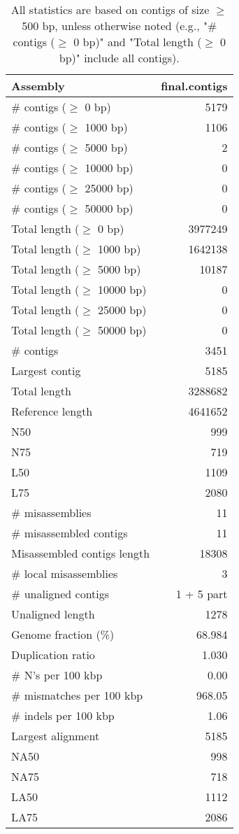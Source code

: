 \documentclass[12pt,a4paper]{article}
\begin{document}
\begin{table}[ht]
\begin{center}
\caption{All statistics are based on contigs of size $\geq$ 500 bp, unless otherwise noted (e.g., "\# contigs ($\geq$ 0 bp)" and "Total length ($\geq$ 0 bp)" include all contigs).}
\begin{tabular}{|l*{1}{|r}|}
\hline
Assembly & final.contigs \\ \hline
\# contigs ($\geq$ 0 bp) & 5179 \\ \hline
\# contigs ($\geq$ 1000 bp) & 1106 \\ \hline
\# contigs ($\geq$ 5000 bp) & 2 \\ \hline
\# contigs ($\geq$ 10000 bp) & 0 \\ \hline
\# contigs ($\geq$ 25000 bp) & 0 \\ \hline
\# contigs ($\geq$ 50000 bp) & 0 \\ \hline
Total length ($\geq$ 0 bp) & 3977249 \\ \hline
Total length ($\geq$ 1000 bp) & 1642138 \\ \hline
Total length ($\geq$ 5000 bp) & 10187 \\ \hline
Total length ($\geq$ 10000 bp) & 0 \\ \hline
Total length ($\geq$ 25000 bp) & 0 \\ \hline
Total length ($\geq$ 50000 bp) & 0 \\ \hline
\# contigs & 3451 \\ \hline
Largest contig & 5185 \\ \hline
Total length & 3288682 \\ \hline
Reference length & 4641652 \\ \hline
N50 & 999 \\ \hline
N75 & 719 \\ \hline
L50 & 1109 \\ \hline
L75 & 2080 \\ \hline
\# misassemblies & 11 \\ \hline
\# misassembled contigs & 11 \\ \hline
Misassembled contigs length & 18308 \\ \hline
\# local misassemblies & 3 \\ \hline
\# unaligned contigs & 1 + 5 part \\ \hline
Unaligned length & 1278 \\ \hline
Genome fraction (\%) & 68.984 \\ \hline
Duplication ratio & 1.030 \\ \hline
\# N's per 100 kbp & 0.00 \\ \hline
\# mismatches per 100 kbp & 968.05 \\ \hline
\# indels per 100 kbp & 1.06 \\ \hline
Largest alignment & 5185 \\ \hline
NA50 & 998 \\ \hline
NA75 & 718 \\ \hline
LA50 & 1112 \\ \hline
LA75 & 2086 \\ \hline
\end{tabular}
\end{center}
\end{table}
\end{document}
